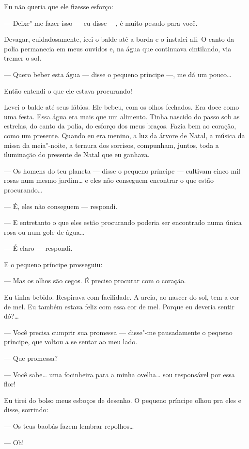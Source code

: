 \begin{Parallel}[p]{}{}
{Eu não queria que ele fizesse esforço:

--- Deixe"-me fazer isso --- eu disse ---, é muito pesado para você.

Devagar, cuidadosamente, icei o balde até a borda e o instalei ali. O
canto da polia permanecia em meus ouvidos e, na água que continuava
cintilando, via tremer o sol.

--- Quero beber esta água --- disse o pequeno príncipe ---, me dá um
pouco\ldots{}

Então entendi o que ele estava procurando!

Levei o balde até seus lábios. Ele bebeu, com os olhos fechados. Era
doce como uma festa. Essa água era mais que um alimento. Tinha nascido
do passo sob as estrelas, do canto da polia, do esforço dos meus braços.
Fazia bem ao coração, como um presente. Quando eu era menino, a luz da
árvore de Natal, a música da missa da meia"-noite, a ternura dos
sorrisos, compunham, juntos, toda a iluminação do presente de Natal que
eu ganhava.

--- Os homens do teu planeta --- disse o pequeno príncipe --- cultivam cinco
mil rosas num mesmo jardim\ldots{} e eles não conseguem encontrar o que estão
procurando\ldots{}

--- É, eles não conseguem --- respondi.

--- E entretanto o que eles estão procurando poderia ser encontrado numa
única rosa ou num gole de água\ldots{}

--- É claro --- respondi.

E o pequeno príncipe prosseguiu:

--- Mas os olhos são cegos. É preciso procurar com o coração.

Eu tinha bebido. Respirava com facilidade. A areia, ao nascer do sol,
tem a cor de mel. Eu também estava feliz com essa cor de mel. Porque eu
deveria sentir dó?\ldots{}

--- Você precisa cumprir sua promessa --- disse"-me pausadamente o pequeno
príncipe, que voltou a se sentar ao meu lado.

--- Que promessa?

--- Você sabe\ldots{} uma focinheira para a minha ovelha\ldots{} sou responsável por
essa flor!

Eu tirei do bolso meus esboços de desenho. O pequeno príncipe olhou pra
eles e disse, sorrindo:

--- Os teus baobás fazem lembrar repolhos\ldots{}

--- Oh!

}
\end{Parallel}
